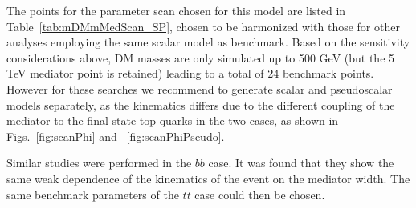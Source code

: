 The points for the parameter scan chosen for this model are listed in Table~\ref{tab:mDMmMedScan_SP}, chosen
to be harmonized with those for other analyses employing the same scalar model as benchmark. 
Based on the sensitivity considerations above, DM masses are only simulated up to 500 GeV (but the 5 TeV mediator point is retained)
leading to a total of 24 benchmark points. However for these searches we recommend to generate scalar and pseudoscalar
models separately, as the kinematics differs due to the different coupling of the mediator to the final state top quarks in the two cases,
as shown in Figs.~\ref{fig:scanPhi} and ~\ref{fig:scanPhiPseudo}.

Similar studies were performed in the $b \bar b$ case. It was found that they 
show the same weak dependence of the kinematics of the event on the mediator width.
The same benchmark parameters of the $t\bar t$ case could then be chosen.


%
%



